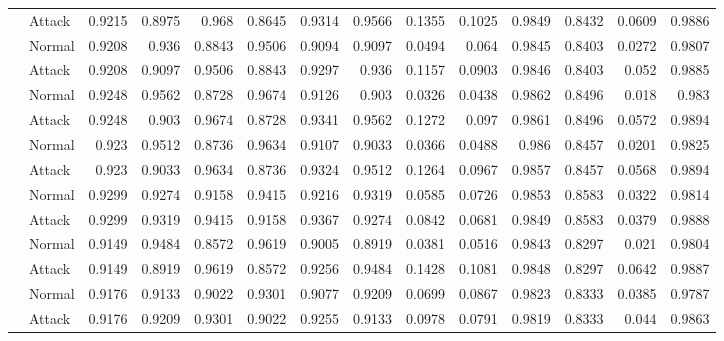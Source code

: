 \begin{tabular}{llrrrrrrrrrrrr}
                & Attack     &     0.9215 &      0.8975 &   0.968  &        0.8645 &     0.9314 & 0.9566 & 0.1355 & 0.1025 &    0.9849 & 0.8432 & 0.0609 &   0.9886 \\
                & Normal     &     0.9208 &      0.936  &   0.8843 &        0.9506 &     0.9094 & 0.9097 & 0.0494 & 0.064  &    0.9845 & 0.8403 & 0.0272 &   0.9807 \\
                & Attack     &     0.9208 &      0.9097 &   0.9506 &        0.8843 &     0.9297 & 0.936  & 0.1157 & 0.0903 &    0.9846 & 0.8403 & 0.052  &   0.9885 \\
                & Normal     &     0.9248 &      0.9562 &   0.8728 &        0.9674 &     0.9126 & 0.903  & 0.0326 & 0.0438 &    0.9862 & 0.8496 & 0.018  &   0.983  \\
                & Attack     &     0.9248 &      0.903  &   0.9674 &        0.8728 &     0.9341 & 0.9562 & 0.1272 & 0.097  &    0.9861 & 0.8496 & 0.0572 &   0.9894 \\
                & Normal     &     0.923  &      0.9512 &   0.8736 &        0.9634 &     0.9107 & 0.9033 & 0.0366 & 0.0488 &    0.986  & 0.8457 & 0.0201 &   0.9825 \\
                & Attack     &     0.923  &      0.9033 &   0.9634 &        0.8736 &     0.9324 & 0.9512 & 0.1264 & 0.0967 &    0.9857 & 0.8457 & 0.0568 &   0.9894 \\
                & Normal     &     0.9299 &      0.9274 &   0.9158 &        0.9415 &     0.9216 & 0.9319 & 0.0585 & 0.0726 &    0.9853 & 0.8583 & 0.0322 &   0.9814 \\
                & Attack     &     0.9299 &      0.9319 &   0.9415 &        0.9158 &     0.9367 & 0.9274 & 0.0842 & 0.0681 &    0.9849 & 0.8583 & 0.0379 &   0.9888 \\
                & Normal     &     0.9149 &      0.9484 &   0.8572 &        0.9619 &     0.9005 & 0.8919 & 0.0381 & 0.0516 &    0.9843 & 0.8297 & 0.021  &   0.9804 \\
                & Attack     &     0.9149 &      0.8919 &   0.9619 &        0.8572 &     0.9256 & 0.9484 & 0.1428 & 0.1081 &    0.9848 & 0.8297 & 0.0642 &   0.9887 \\
                & Normal     &     0.9176 &      0.9133 &   0.9022 &        0.9301 &     0.9077 & 0.9209 & 0.0699 & 0.0867 &    0.9823 & 0.8333 & 0.0385 &   0.9787 \\
                & Attack     &     0.9176 &      0.9209 &   0.9301 &        0.9022 &     0.9255 & 0.9133 & 0.0978 & 0.0791 &    0.9819 & 0.8333 & 0.044  &   0.9863 \\

\end{tabular}
